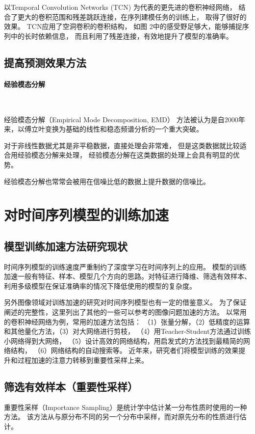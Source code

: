     以Temporal Convolution Networks (TCN) 为代表的更先进的卷积神经网络，
    结合了更大的卷积范围和残差跳跃连接，在序列建模任务的训练上，
    取得了很好的效果\cite{bai2018empirical,pascanu2013construct}。
    TCN应用了空洞卷积的卷积结构，
    如图 2中的感受野足够大，能够捕捉序列中的长时依赖信息，
    而且利用了残差连接，有效地提升了模型的准确率。
  
\subsection{提高预测效果方法}
  \paragraph{经验模态分解}~{}

    经验模态分解（Empirical Mode Decomposition, EMD）
    方法被认为是自2000年来，以傅立叶变换为基础的线性和稳态频谱分析的一个重大突破。
    
    对于非线性数据尤其是非平稳数据，直接处理会非常难，
    但是这类数据就比较适合用经验模态分解来处理，
    经验模态分解在这类数据的处理上会具有明显的优势。
    
    经验模态分解也常常会被用在信噪比低的数据上提升数据的信噪比。
\section{对时间序列模型的训练加速}
  \subsection{模型训练加速方法研究现状}
  时间序列模型的训练速度严重制约了深度学习在时间序列上的应用。
  模型的训练加速一般有特征、样本、模型几个方向的思路。对特征进行降维、筛选有效样本、
  利用多级模型在保证准确率的情况下降低使用的模型的复杂度。

  另外图像领域对训练加速的研究对时间序列模型也有一定的借鉴意义。
  为了保证阐述的完整性，这里列出了其他的一些可以参考的图像问题加速的方法。
  以常用的卷积神经网络为例，常用的加速方法包括：
  （1）张量分解，（2）低精度的运算和其他量化方法，（3）对大网络进行剪枝，
  （4）用Teacher-Student方法通过训练小网络得到大网络，
  （5）设计高效的网络结构，用启发式的方法找到最精简的网络结构，
  （6）网络结构的自动搜索等\cite{lebedev2018speeding}。
  近年来，研究者们将模型训练的效果提升和过程加速的注意力转移到重要性采样上来。

  \subsection{筛选有效样本（重要性采样）}
  重要性采样（Importance Sampling）是统计学中估计某一分布性质时使用的一种方法。
  该方法从与原分布不同的另一个分布中采样，而对原先分布的性质进行估计。

